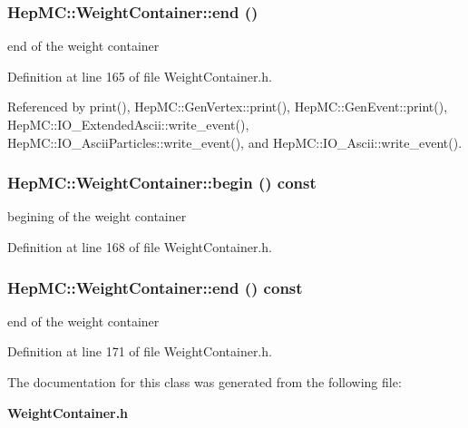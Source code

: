 \subsubsection{ Hep\-MC::Weight\-Container::end ()\hspace{0.3cm}{\tt  [inline]}}\label{classHepMC_1_1WeightContainer_972a0daa1bf368361f0fdcf4dc509460}


end of the weight container 



Definition at line 165 of file Weight\-Container.h.

Referenced by print(), Hep\-MC::Gen\-Vertex::print(), Hep\-MC::Gen\-Event::print(), Hep\-MC::IO\_\-Extended\-Ascii::write\_\-event(), Hep\-MC::IO\_\-Ascii\-Particles::write\_\-event(), and Hep\-MC::IO\_\-Ascii::write\_\-event().
\subsubsection{ Hep\-MC::Weight\-Container::begin () const\hspace{0.3cm}{\tt  [inline]}}\label{classHepMC_1_1WeightContainer_27e9986fb4bf27a4a993d37b6a028004}


begining of the weight container 



Definition at line 168 of file Weight\-Container.h.
\subsubsection{ Hep\-MC::Weight\-Container::end () const\hspace{0.3cm}{\tt  [inline]}}\label{classHepMC_1_1WeightContainer_b5c512942a5ae03a9ba68b43a0f20906}


end of the weight container 



Definition at line 171 of file Weight\-Container.h.

The documentation for this class was generated from the following file:\begin{CompactItemize}
\item 
{\bf Weight\-Container.h}\end{CompactItemize}
